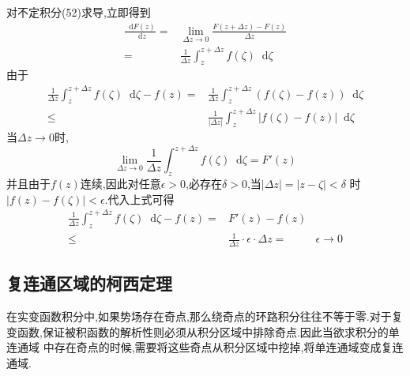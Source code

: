\documentclass[UTF8]{ctexart}
\newcommand{\dif}{\mathop{}\!\mathrm{d}}
\begin{document}
对不定积分(52)求导,立即得到
\begin{align}
  \label{7}
  \frac{\dif F(z)}{\dif z}=&\lim_{\Delta z\rightarrow 0}\frac{F(z+\Delta z)-F(z)}{\Delta z} \\
  =&\frac{1}{\Delta z}\int_{z}^{z+\Delta z}f(\zeta)\dif \zeta
\end{align}
由于
\begin{align}
  \label{6}
  \frac{1}{\Delta z}\int_{z}^{z+\Delta z}f(\zeta)\dif \zeta-f(z)=&\frac{1}{\Delta z}\int_{z}^{z+\Delta z}\left(f(\zeta)-f(z)\right)\dif \zeta \\
  \leqslant&\frac{1}{\left| \Delta z \right| }\int_{z}^{z+\Delta z}\left| f(\zeta)-f(z) \right|\dif \zeta
\end{align}
当$\Delta z\rightarrow 0$时,
\begin{equation}
  \lim_{\Delta z\rightarrow 0}\frac{1}{\Delta z}\int_{z}^{z+\Delta z}f(\zeta)\dif \zeta=F'(z)
\end{equation}
并且由于$f(z)$连续,因此对任意$\epsilon>0$,必存在$\delta>0$,当$\left| \Delta z \right| =\left| z-\zeta \right| <\delta$
时$\left| f(z)-f(\zeta) \right|<\epsilon$.代入上式可得
\begin{align}
  \label{5}
  \frac{1}{\Delta z}\int_{z}^{z+\Delta z}f(\zeta)\dif \zeta-f(z)=&F'(z)-f(z) \\
  \leqslant&\frac{1}{\Delta z}\cdot \epsilon \cdot \Delta z
  =&\epsilon \rightarrow 0
\end{align}

\subsection{复连通区域的柯西定理}
在实变函数积分中,如果势场存在奇点,那么绕奇点的环路积分往往不等于零.对于复变函数,保证被积函数的解析性则必须从积分区域中排除奇点.因此当欲求积分的单连通域
中存在奇点的时候,需要将这些奇点从积分区域中挖掉,将单连通域变成复连通域.
\end{document}
